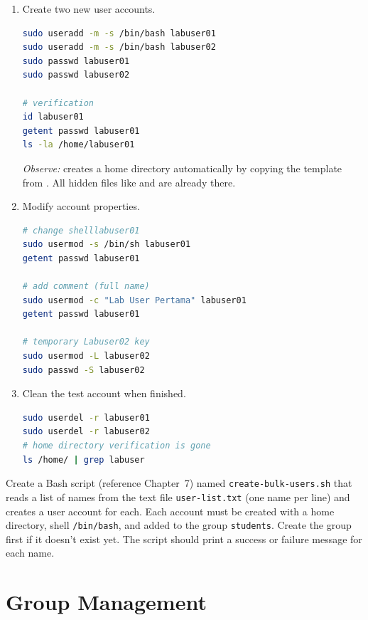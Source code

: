 \begin{enumerate}
\item Create two new user accounts.
\begin{lstlisting}[language=bash, caption={Create a user account}]
sudo useradd -m -s /bin/bash labuser01
sudo useradd -m -s /bin/bash labuser02
sudo passwd labuser01
sudo passwd labuser02

# verification
id labuser01
getent passwd labuser01
ls -la /home/labuser01
\end{lstlisting}

\textit{Observe:}  creates a home directory automatically by copying the template from . All hidden files like  and  are already there.

\item Modify account properties.
\begin{lstlisting}[language=bash, caption={Modify user accounts}]
# change shelllabuser01
sudo usermod -s /bin/sh labuser01
getent passwd labuser01

# add comment (full name)
sudo usermod -c "Lab User Pertama" labuser01
getent passwd labuser01

# temporary Labuser02 key
sudo usermod -L labuser02
sudo passwd -S labuser02
\end{lstlisting}

\item Clean the test account when finished.
\begin{lstlisting}[language=bash, caption={Delete the test account}]
sudo userdel -r labuser01
sudo userdel -r labuser02
# home directory verification is gone
ls /home/ | grep labuser
\end{lstlisting}
\end{enumerate}

\begin{challengebox}
Create a Bash script (reference Chapter~7) named \texttt{create-bulk-users.sh} that reads a list of names from the text file \texttt{user-list.txt} (one name per line) and creates a user account for each. Each account must be created with a home directory, shell \texttt{/bin/bash}, and added to the group \texttt{students}. Create the group first if it doesn't exist yet. The script should print a success or failure message for each name.
\end{challengebox}

\section{Group Management}
\label{sec:group-management}

